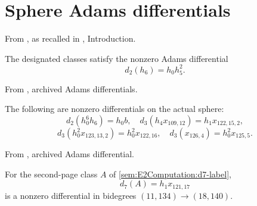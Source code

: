 

\section{Sphere Adams differentials}

\begin{theorem}
\label{sem:Computation:one-line-differential}
From \cite{Adams60}, as recalled in \cite{LWX126}, Introduction.\par
The designated classes satisfy the nonzero Adams differential
\[d_2(h_6)=h_0h_5^2.\]
\end{theorem}

\begin{theorem}
\label{sem:Computation:low-differentials}
From \cite{LinProgram}, archived Adams differentials.\par
The following are nonzero differentials on the actual sphere:
\[d_2(h_0^6h_6)=h_0b,\quad d_3(h_4x_{109,12})=h_1x_{122,15,2},\]
\[d_3(h_0^2x_{123,13,2})=h_0^2x_{122,16},\quad d_3(x_{126,4})=h_0^2x_{125,5}.\]
\end{theorem}

\begin{theorem}
\label{sem:Computation:d7-source}
From \cite{LinProgram}, archived Adams differential.\par
For the second-page class $A$ of \ref{sem:E2Computation:d7-label},
\[d_7(A)=h_1x_{121,17}\]
is a nonzero differential in bidegrees $(11,134)\to(18,140)$.
\end{theorem}

